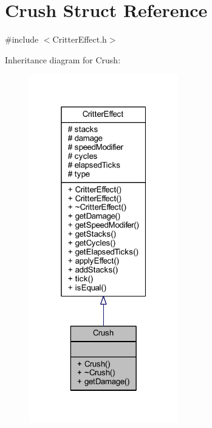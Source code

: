 \hypertarget{struct_crush}{\section{Crush Struct Reference}
\label{struct_crush}
}


{\ttfamily \#include $<$Critter\+Effect.\+h$>$}



Inheritance diagram for Crush\+:
\nopagebreak
\begin{figure}[H]
\begin{center}
\leavevmode
\includegraphics[width=184pt]{struct_crush__inherit__graph}
\end{center}
\end{figure}


